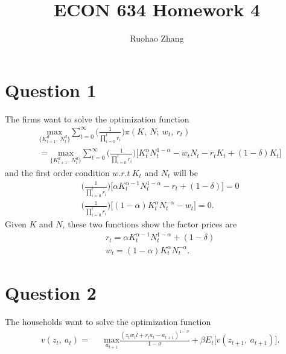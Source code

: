 \documentclass{article}
\begin{document}
\title{ECON 634 Homework 4}
\author{Ruohao Zhang}
\maketitle
\thispagestyle{fancy}

\section*{\normalsize{Question 1}}
The firms want to solve the optimization function
\begin{equation*}
\begin{aligned}
&\underset{\{K^d_{t+1},\ N^d_t\}}{\text{max}}
\sum_{t=0}^{\infty}\bigg(\frac{1}{\prod^t_{i=0}r_i}\bigg)\pi(K, \ N; \ w_t, \ r_t) \\
&= \underset{\{K^d_{t+1},\ N^d_t\}}{\text{max}}\sum_{t=0}^{\infty}\bigg(\frac{1}{\prod^t_{i=0}r_i}\bigg)\big[K_t^\alpha N_t^{1-\alpha}-w_tN_t-r_tK_t+(1-\delta)K_t\big] 
\end{aligned}
\end{equation*}
and the first order condition $w.r.t \ K_t$ and $N_t$ will be
\begin{equation*}
\begin{aligned}
&\bigg(\frac{1}{\prod^t_{i=0}r_i}\bigg)\big[\alpha K_t^{\alpha -1}N_t^{1-\alpha}-r_t+(1-\delta)\big]=0 \\
&\bigg(\frac{1}{\prod^t_{i=0}r_i}\bigg)\big[(1-\alpha) K_t^{\alpha}N_t^{-\alpha}-w_t\big]=0. 
\end{aligned}
\end{equation*}
Given $K$ and $N$, these two functions show the factor prices are
\begin{equation*}
\begin{aligned}
&r_t=\alpha K_t^{\alpha -1}N_t^{1-\alpha}+(1-\delta) \\
&w_t=(1-\alpha) K_t^{\alpha}N_t^{-\alpha}.
\end{aligned}
\end{equation*}
\section*{\normalsize{Question 2}}
The households want to solve the optimization function
\begin{equation*}
\begin{aligned}
&v(z_t, \ a_t)=
& &\underset{a_{t+1}}{\text{max}}\frac{(z_tw_t\bar{l}+r_ta_t-a_{t+1})^{1-\sigma}}{1-\sigma}+\beta E_t\big[v(z_{t+1}, \ a_{t+1})\big]. \\
\end{aligned}
\end{equation*}	
\end{document}
